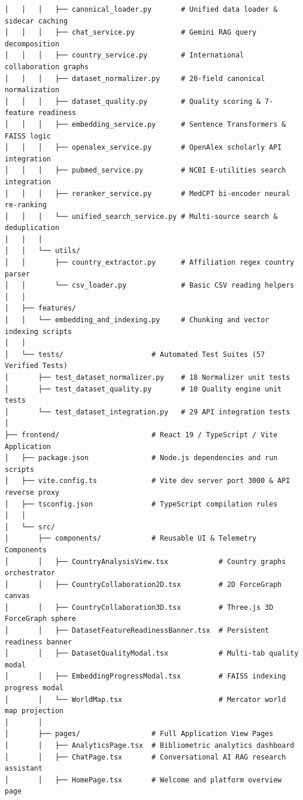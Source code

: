 \begin{lstlisting}[caption={Annotated Research Rover Project Tree}]
│   │   │   ├── canonical_loader.py       # Unified data loader & sidecar caching
│   │   │   ├── chat_service.py           # Gemini RAG query decomposition
│   │   │   ├── country_service.py        # International collaboration graphs
│   │   │   ├── dataset_normalizer.py     # 20-field canonical normalization
│   │   │   ├── dataset_quality.py        # Quality scoring & 7-feature readiness
│   │   │   ├── embedding_service.py      # Sentence Transformers & FAISS logic
│   │   │   ├── openalex_service.py       # OpenAlex scholarly API integration
│   │   │   ├── pubmed_service.py         # NCBI E-utilities search integration
│   │   │   ├── reranker_service.py       # MedCPT bi-encoder neural re-ranking
│   │   │   └── unified_search_service.py # Multi-source search & deduplication
│   │   │
│   │   └── utils/
│   │       ├── country_extractor.py      # Affiliation regex country parser
│   │       └── csv_loader.py             # Basic CSV reading helpers
│   │
│   ├── features/
│   │   └── embedding_and_indexing.py     # Chunking and vector indexing scripts
│   │
│   └── tests/                     # Automated Test Suites (57 Verified Tests)
│       ├── test_dataset_normalizer.py    # 18 Normalizer unit tests
│       ├── test_dataset_quality.py       # 10 Quality engine unit tests
│       └── test_dataset_integration.py   # 29 API integration tests
│
├── frontend/                      # React 19 / TypeScript / Vite Application
│   ├── package.json               # Node.js dependencies and run scripts
│   ├── vite.config.ts             # Vite dev server port 3000 & API reverse proxy
│   ├── tsconfig.json              # TypeScript compilation rules
│   │
│   └── src/
│       ├── components/            # Reusable UI & Telemetry Components
│       │   ├── CountryAnalysisView.tsx            # Country graphs orchestrator
│       │   ├── CountryCollaboration2D.tsx         # 2D ForceGraph canvas
│       │   ├── CountryCollaboration3D.tsx         # Three.js 3D ForceGraph sphere
│       │   ├── DatasetFeatureReadinessBanner.tsx  # Persistent readiness banner
│       │   ├── DatasetQualityModal.tsx            # Multi-tab quality modal
│       │   ├── EmbeddingProgressModal.tsx         # FAISS indexing progress modal
│       │   └── WorldMap.tsx                       # Mercator world map projection
│       │
│       ├── pages/                 # Full Application View Pages
│       │   ├── AnalyticsPage.tsx  # Bibliometric analytics dashboard
│       │   ├── ChatPage.tsx       # Conversational AI RAG research assistant
│       │   ├── HomePage.tsx       # Welcome and platform overview page

\end{lstlisting}
